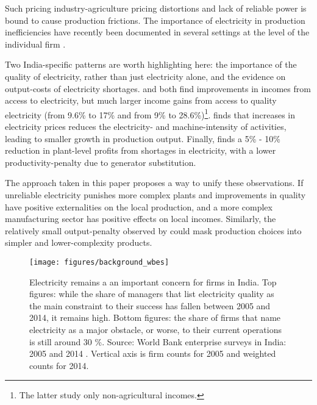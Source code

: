 \documentclass[11pt]{article}
\begin{document}
Such pricing industry-agriculture pricing distortions and lack of reliable power is bound to cause production frictions. The importance of electricity in production inefficiencies have recently been documented in several settings at the level of the individual firm \citep{grainger_impact_2017,abeberese_productivity_2019,fisher-vanden_electricity_2015}. 

Two India-specific patterns are worth highlighting here: the importance of the quality of electricity, rather than just electricity alone, and the evidence on output-costs of electricity shortages. \cite{samad_benefits_2016} and \cite{chakravorty_does_2014} both find improvements in incomes from access to electricity, but much larger income gains from access to quality electricity (from 9.6\% to 17\% and from 9\% to 28.6\%)\footnote{The latter study only non-agricultural incomes.}. \cite{abeberese_electricity_2017} finds that increases in electricity prices reduces the electricity- and machine-intensity of activities, leading to smaller growth in production output. Finally, \cite{allcott_how_2016} finds a 5\% - 10\% reduction in plant-level profits from shortages in electricity, with a lower productivity-penalty due to generator substitution.

The approach taken in this paper proposes a way to unify these observations. If unreliable electricity punishes more complex plants and improvements in quality have positive externalities on the local production, and a more complex manufacturing sector has positive effects on local incomes. Similarly, the relatively small output-penalty observed by \cite{allcott_how_2016} could mask production choices into simpler and lower-complexity products.


\begin{figure}[htpb]
	\centering
	\texttt{[image: figures/background\_wbes]}
	\caption[Enterprise survey: obstacles for firms]{Electricity remains a an important concern for firms in India. Top figures: while the share of managers that list electricity quality as the main constraint to their success has fallen between 2005 and 2014, it remains high. Bottom figures: the share of firms that name electricity as a major obstacle, or worse, to their current operations is still around 30 \%. Source: World Bank enterprise surveys in India: 2005 and 2014 \citep{world_bank_enterprise_2020-2,world_bank_enterprise_2020-1}. Vertical axis is firm counts for 2005 and weighted counts for 2014.}
	\label{fig:biggest_obstacle}
\end{figure}
\end{document}
